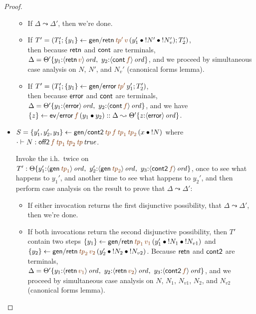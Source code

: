 \begin{proof}
\begin{itemize}
\begin{itemize}
\item If $\Delta \leadsto \Delta'$, then we're done. 
\item If $T' = \left(T_1'; \trstep{y_1}{{\sf gen/retn}\,\lf{{\it tp}'}\,\lf{v}\,(\tfuser{y_1'}{\tfuser{\tbangr{N'}}{\tbangr{N_v'}}})}; T_2'\right)$,
\\
then because ${\sf retn}$ and ${\sf cont}$ are 
terminals, $\Delta = \tackon{\Theta'}{
         y_1{:}\istrue{\susp{{\sf retn}\,\lf{v}}}, ~
         y_2{:}\istrue{\susp{{\sf cont}\,\lf{f}}}}$, and we 
proceed by
simultaneous case analysis on $N$, $N'$, and $N_v'$ (canonical forms lemma). 
\item If $T' = \left(T_1'; \trstep{y_1}{{\sf gen/error}\,\lf{{\it tp}'}\,y_1'}; T_2'\right)$,
\\
then because ${\sf error}$ and ${\sf cont}$ are terminals,
$\Delta = \tackon{\Theta'}{
         y_1{:}\istrue{\susp{{\sf error}}}, ~
         y_2{:}\istrue{\susp{{\sf cont}\,\lf{f}}}}$, and we have
$\trstep{z}{{\sf ev/error}\,\lf{f}\,(\tfuser{y_1}{y_2})} :: \Delta \leadsto \tackon{\Theta'}{z{:}\istrue{\susp{{\sf error}}}}$.

\end{itemize}

\medskip
\item $S = \trstep{y_1', y_2', y_3}{{\sf gen/cont2}\,\lf{{\it tp}}\,\lf{f}\,\lf{{\it tp}_1}\,\lf{{\it tp}_2}\,(\tfuser{x}{\tbangr{N}})}$
where $\cdot \vdash N : \isconc{{\sf off2}\,\lf{f}\,\lf{{\it tp}_1}\, \lf{{\it tp}_2}\,\lf{{\it tp}}}$.


Invoke the i.h.~twice on $T' :
\tackon{\Theta}{y_1'{:}\istrue{\susp{{\sf gen}\,\lf{{\it tp}_1}}}, ~
  y_2'{:}\istrue{\susp{{\sf gen}\,\lf{{\it tp}_2}}}, ~
  y_3{:}\istrue{\susp{{\sf cont2}\,\lf{f}}}}$, once to see what happens
to $y_1'$, and another time to see what happens to $y_2'$,
and then perform case analysis on the result to prove that
$\Delta \leadsto \Delta'$:

\begin{itemize}
\item If either invocation returns the first disjunctive possibility,
  that $\Delta \leadsto \Delta'$, then we're done.

\item
If both invocations return the second disjunctive possibility, then
 $T'$ contain two steps
$\trstep{y_1}{{\sf gen/retn}\,\lf{{\it tp}_1}\,\lf{v_1}\,(\tfuser{y_1'}{\tfuser{\tbangr{N_1}}{\tbangr{N_{v1}}}})}$ and \\
$\trstep{y_2}{{\sf gen/retn}\,\lf{{\it tp}_2}\,\lf{v_2}\,(\tfuser{y_2'}{\tfuser{\tbangr{N_2}}{\tbangr{N_{v2}}}})}$. Because ${\sf retn}$ and ${\sf cont2}$
are terminals, \\$\Delta = \tackon{\Theta'}{y_1{:}\istrue{\susp{{\sf retn}\,\lf{v_1}}}, ~ y_2{:}\istrue{\susp{{\sf retn}\,\lf{v_2}}}, ~ y_3{:}\istrue{\susp{{\sf cont2}\,\lf{f}}}}$, and we proceed
by simultaneous case analysis on $N$, $N_1$, $N_{v1}$, $N_2$, and $N_{v2}$
(canonical forms lemma). 


\end{itemize}
\end{itemize}
\end{proof}
